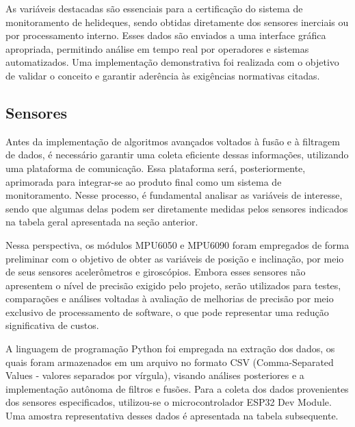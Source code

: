 \documentclass[a4paper, 12pt]{article}
\begin{document}
    As variáveis destacadas são essenciais para a certificação do sistema de monitoramento de helideques, sendo obtidas diretamente dos sensores inerciais ou por processamento interno. Esses dados são enviados a uma interface gráfica apropriada, permitindo análise em tempo real por operadores e sistemas automatizados. Uma implementação demonstrativa foi realizada com o objetivo de validar o conceito e garantir aderência às exigências normativas citadas.

        
    \newpage
    \subsection{Sensores}
        Antes da implementação de algoritmos avançados voltados à fusão e à filtragem de dados, é necessário garantir uma coleta eficiente dessas informações, utilizando uma plataforma de comunicação. Essa plataforma será, posteriormente, aprimorada para integrar-se ao produto final como um sistema de monitoramento. Nesse processo, é fundamental analisar as variáveis de interesse, sendo que algumas delas podem ser diretamente medidas pelos sensores indicados na tabela geral apresentada na seção anterior.

        Nessa perspectiva, os módulos MPU6050 e MPU6090 foram empregados de forma preliminar com o objetivo de obter as variáveis de posição e inclinação, por meio de seus sensores acelerômetros e giroscópios. Embora esses sensores não apresentem o nível de precisão exigido pelo projeto, serão utilizados para testes, comparações e análises voltadas à avaliação de melhorias de precisão por meio exclusivo de processamento de software, o que pode representar uma redução significativa de custos.

        A linguagem de programação Python foi empregada na extração dos dados, os quais foram armazenados em um arquivo no formato CSV (Comma-Separated Values - valores separados por vírgula), visando análises posteriores e a implementação autônoma de filtros e fusões. Para a coleta dos dados provenientes dos sensores especificados, utilizou-se o microcontrolador ESP32 Dev Module. Uma amostra representativa desses dados é apresentada na tabela subsequente.
\end{document}

